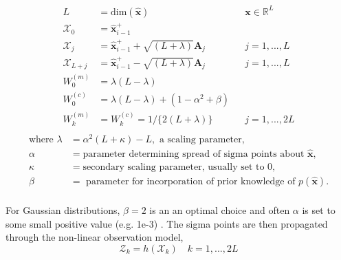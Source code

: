 \begin{equation}
    \begin{aligned}
        L                   &= \text{dim}(\hat{\bm{x}})                                                      && \bm{x}\in{\mathbb{R}}^{L} \\
        \mathcal{X}_0       &= \hat{\bm{x}}_{i-1}^{+}                                                                                     \\
        \mathcal{X}_j       &= \hat{\bm{x}}_{i-1}^{+} + \sqrt{(L+\lambda)} \bm{A}_j                          && j=1,...,L                 \\
        \mathcal{X}_{L+j}   &= \hat{\bm{x}}_{i-1}^{+} - \sqrt{(L+\lambda)} \bm{A}_j                          && j=1,...,L                 \\
        W_0^{(m)}           &= \lambda(L-\lambda)                                                                                         \\
        W_0^{(c)}           &= \lambda(L-\lambda) + (1-\alpha^2 + \beta)                                                                  \\
        W_k^{(m)}           &= W_k^{(c)} = 1/\{2(L+\lambda)\}                                                && j=1,...,2L                \\
    \end{aligned}
\end{equation}
\begin{equation*}
    \begin{aligned}
    \text{where  }
        \lambda &= \alpha^2(L+\kappa)-L,\text{ a scaling parameter,} \\
        \alpha  &= \text{parameter determining spread of sigma points about }\hat{\bm{x}}\text{,} \\
        \kappa  &= \text{secondary scaling parameter, usually set to }0, \\
        \beta   &= \text{ parameter for incorporation of prior knowledge of }p(\hat{\bm{x}}).\\
    \end{aligned}
\end{equation*}

For Gaussian distributions, $\beta=2$ is an an optimal choice and often $\alpha$
is set to some small positive value (e.g. 1e-3) \cite{Wan2000}. The sigma points
are then propagated through the non-linear observation model,
\begin{equation}
    \mathcal{Z}_k  = h(\mathcal{X}_k)\,\,\,\,\,\,k=1,...,2L
\end{equation}

